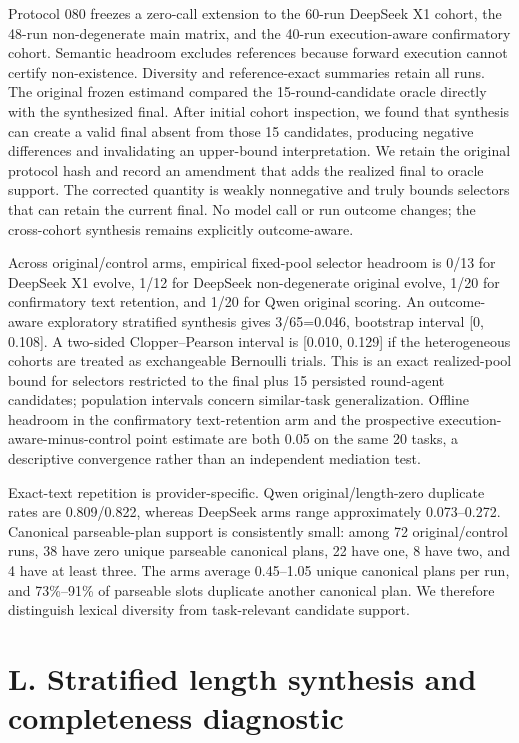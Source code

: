 \documentclass{article}
\begin{document}
Protocol 080 freezes a zero-call extension to the 60-run DeepSeek X1 cohort, the 48-run non-degenerate main matrix, and the 40-run execution-aware confirmatory cohort. Semantic headroom excludes \texttt{} references because forward execution cannot certify non-existence. Diversity and reference-exact summaries retain all runs. The original frozen estimand compared the 15-round-candidate oracle directly with the synthesized final. After initial cohort inspection, we found that synthesis can create a valid final absent from those 15 candidates, producing negative differences and invalidating an upper-bound interpretation. We retain the original protocol hash and record an amendment that adds the realized final to oracle support. The corrected quantity is weakly nonnegative and truly bounds selectors that can retain the current final. No model call or run outcome changes; the cross-cohort synthesis remains explicitly outcome-aware.

Across original/control arms, empirical fixed-pool selector headroom is 0/13 for DeepSeek X1 evolve, 1/12 for DeepSeek non-degenerate original evolve, 1/20 for confirmatory text retention, and 1/20 for Qwen original scoring. An outcome-aware exploratory stratified synthesis gives 3/65=0.046, bootstrap interval [0, 0.108]. A two-sided Clopper--Pearson interval is [0.010, 0.129] if the heterogeneous cohorts are treated as exchangeable Bernoulli trials. This is an exact realized-pool bound for selectors restricted to the final plus 15 persisted round-agent candidates; population intervals concern similar-task generalization. Offline headroom in the confirmatory text-retention arm and the prospective execution-aware-minus-control point estimate are both 0.05 on the same 20 tasks, a descriptive convergence rather than an independent mediation test.

Exact-text repetition is provider-specific. Qwen original/length-zero duplicate rates are 0.809/0.822, whereas DeepSeek arms range approximately 0.073--0.272. Canonical parseable-plan support is consistently small: among 72 original/control runs, 38 have zero unique parseable canonical plans, 22 have one, 8 have two, and 4 have at least three. The arms average 0.45--1.05 unique canonical plans per run, and 73\%--91\% of parseable slots duplicate another canonical plan. We therefore distinguish lexical diversity from task-relevant candidate support.

\section{L. Stratified length synthesis and completeness diagnostic}
\end{document}
